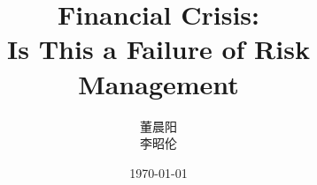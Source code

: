 \documentclass{ctexart}
\title{Financial Crisis:\\ Is This a Failure of Risk Management}
\author{董晨阳\\李昭伦}
\date{\today}
\begin{document}
\maketitle
\tableofcontents
\clearpage



\nocite{*}
\appendix
\printbibliography
\end{document}
